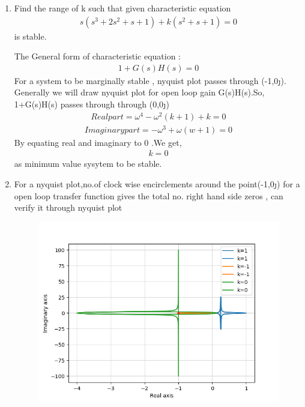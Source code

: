 \begin{enumerate}[label=\thesection.\arabic*.,ref=\thesection.\theenumi]
\item Find the range of k such that given characteristic equation
\begin{align}
s(s^3+2s^2+s+1) +k(s^2+s+1) = 0
\label{eq:ee18btech11042_1}
\end{align}
is stable.

\solution
The General form of characteristic equation :
\begin{align}
1+G(s)H(s) = 0
\label{eq:ee18btech11042_2}    
\end{align}
For a system to be marginally stable , nyquist plot passes through (-1,0\j ). Generally we will draw nyquist plot for open loop gain G(s)H(s).So,  1+G(s)H(s) passes through through (0,0\j)
\begin{align}
Real part = \omega^4 - \omega^2(k+1) +k = 0
\label{eq:ee18btech11042_3}
\end{align}
\begin{align}
Imaginary part = -\omega^3 +\omega(w+1) = 0
\label{eq:ee18btech11042_4}
\end{align}
By equating real and imaginary to 0 .We get,
\begin{align}
k = 0
\label{eq:ee18btech11042_5}
\end{align}
as minimum value sysytem to be stable.
\item For a nyquist plot,no.of clock wise encirclements around the point(-1,0\j) for a open loop transfer function gives the total no. right hand side  zeros ,
\We can verify it through nyquist plot

\begin{figure}[!h]
  \includegraphics[width=\columnwidth]{./figs/ee18btech11042_1.png}
  \label{fig:ee18btech11042_1.png}
\end{figure}



\end{enumerate}
